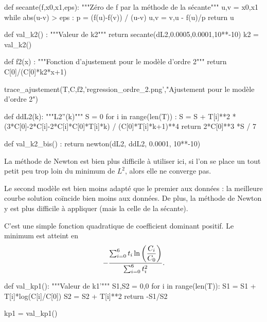\question{}
\begin{pyverbatim}
def secante(f,x0,x1,eps):
    """Zéro de f par la méthode de la sécante"""
    u,v = x0,x1
    while abs(u-v) > eps : 
        p = (f(u)-f(v)) / (u-v)
        u,v = v,u - f(u)/p
    return u
\end{pyverbatim}

\question{}
\begin{pyverbatim}
def val_k2() :
    """Valeur de k2"""
    return secante(dL2,0.0005,0.0001,10**-10)
k2 = val_k2()  
\end{pyverbatim}

\question{}
\begin{pyverbatim}
def f2(x) :
    """Fonction d'ajustement pour le modèle d'ordre 2"""
    return  C[0]/(C[0]*k2*x+1)

trace_ajustement(T,C,f2,'regression_ordre_2.png',"Ajustement pour le modèle d'ordre 2")  
\end{pyverbatim}

\question{}
\begin{pyverbatim}
def ddL2(k):
    """L2''(k)"""
    S = 0
    for i in range(len(T)) :
        S = S + T[i]**2 * (3*C[0]-2*C[i]-2*C[i]*C[0]*T[i]*k) / (C[0]*T[i]*k+1)**4
    return  2*C[0]**3 *S / 7

def val_k2_bis() :
    return newton(dL2, ddL2, 0.0001, 10**-10)
\end{pyverbatim}
La méthode de Newton est bien plus difficile à utiliser ici, si l'on se place un tout petit peu trop loin du minimum de $L^2$, alors elle ne converge pas.

\question{}
Le second modèle est bien moins adapté que le premier aux données : la meilleure courbe solution coïncide bien moins aux données. De plus, la méthode de Newton y est plus difficile à appliquer (mais la celle de la sécante). 

\question{}
C'est une simple fonction quadratique de coefficient dominant positif. Le minimum est atteint en 
\begin{equation*}
  -\dfrac{\sum_{i=0}^6 t_i \ln\left( \dfrac{C_i}{C_0}\right)}{\sum_{i=0}^6 t_i^2}.
\end{equation*}

\question{}
\begin{pyverbatim}
def val_kp1():
    """Valeur de k1'"""
    S1,S2 = 0,0
    for i in range(len(T)):
        S1 = S1 + T[i]*log(C[i]/C[0])
        S2 = S2 + T[i]**2
    return -S1/S2
    
kp1 = val_kp1()
\end{pyverbatim}

